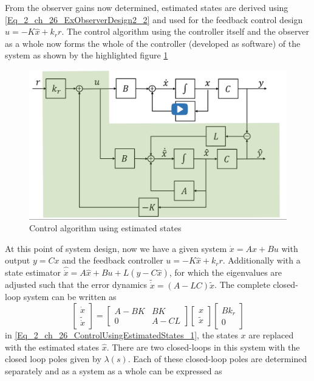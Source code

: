 From the observer gains now determined, estimated states are derived using \eqref{Eq_2_ch_26_ExObserverDesign2_2} and used for the feedback control design $u = -K\hat{x} + k_{r}r$. The control algorithm using the controller itself and the observer as a whole now forms the whole of the controller (developed as software) of the system as shown by the highlighted figure \ref{fig_2_ch_26_ControlUsingEstimatedStates}
\begin{figure}[h!]
	\centering
	\includegraphics[width=0.75\linewidth]{Bilder/ControlFromEstimatedStates.png}
	\caption{Control algorithm using estimated states}
	\label{fig_2_ch_26_ControlUsingEstimatedStates}
\end{figure}
At this point of system design, now we have a given system $\dot{x} = Ax + Bu$ with output $y = Cx$ and the feedback controller $u = -K\hat{x} + k_{r}r$. Additionally with a state estimator $\hat{\dot{x}} = A \hat{x} + Bu + L (y - C\hat{x})$, for which the eigenvalues are adjusted such that the error dynamics $\tilde{\dot{x}} = (A - LC)\tilde{x}$. The complete closed-loop system can be written as
\begin{equation}\label{Eq_2_ch_26_ControlUsingEstimatedStates_1}
	\begin{bmatrix} \dot{x} \\ \tilde{\dot{x}} \end{bmatrix} = \begin{bmatrix}
	A - BK & BK \\ 0 & A - CL
	\end{bmatrix}\begin{bmatrix}
	x \\ \tilde{x}
	\end{bmatrix}\begin{bmatrix}
	B k_r \\ 0
	\end{bmatrix}
\end{equation}
in \eqref{Eq_2_ch_26_ControlUsingEstimatedStates_1}, the states $x$ are replaced with the estimated states $\hat{x}$. There are two closed-loops in this system with the closed loop poles given by $\lambda(s)$. Each of these closed-loop poles are determined separately and as a system as a whole can be expressed as
